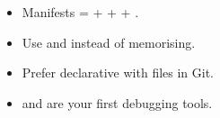 \begin{recap}
\begin{itemize}
  \item Manifests =  +  +  + .
  \item Use  and  instead of memorising.
  \item Prefer declarative  with files in Git.
  \item {} and  are your first debugging tools.
\end{itemize}
\end{recap}

